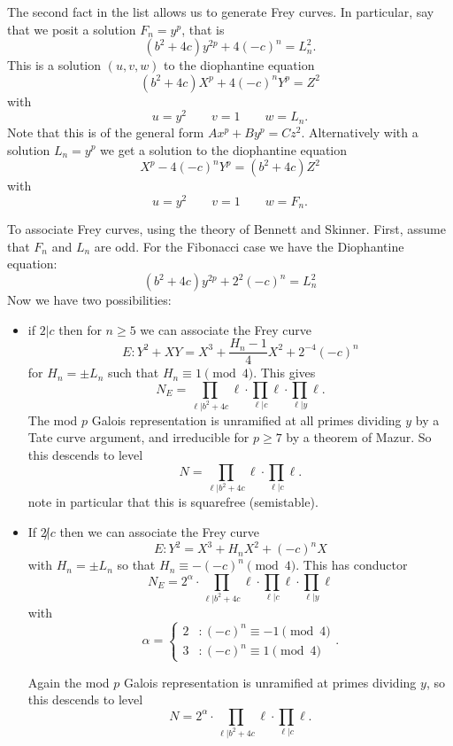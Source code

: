\documentclass[12pt]{article}
\begin{document}
The second fact in the list allows us to generate Frey curves.  In particular, say that we posit a solution $F_n = y^p$, that is
\[ (b^2+4c)y^{2p}+4(-c)^n = L_n^2 .\]
This is a solution $(u,v,w)$ to the diophantine equation
\[ (b^2+4c)X^p +4(-c)^nY^p = Z^2 \]
with 
\[ u = y^2 \qquad v = 1 \qquad w = L_n .\]
Note that this is of the general form $Ax^p+By^p = Cz^2$.  Alternatively with a solution $L_n = y^p$ we get a solution to the diophantine equation
\[ X^p-4(-c)^nY^p = (b^2+4c)Z^2 \]
with
\[ u = y^2 \qquad v = 1 \qquad w = F_n .\]

To associate Frey curves, using the theory of Bennett and Skinner.  First, assume that $F_n$ and $L_n$ are odd.  For the Fibonacci case we have the Diophantine equation:
\[(b^2+4c)y^{2p} +2^2(-c)^n = L_n^2 \]
Now we have two possibilities:

\begin{itemize}

\item if $2 |c$ then for $n \geq 5$ we can associate the Frey curve
\[ E: Y^2 +XY = X^3 +\frac{H_n -1}{4} X^2 +2^{-4}(-c)^n \]
for $H_n = \pm L_n$ such that $H_n \equiv 1 \pmod{4}$.  This gives
\[ N_E = \prod_{\ell | b^2+4c} \ell \cdot \prod_{\ell | c} \ell \cdot \prod_{\ell | y} \ell. \]
The mod $p$ Galois representation is unramified at all primes dividing $y$ by a Tate curve argument, and irreducible for $p \geq 7$ by a theorem of Mazur.  So this descends to level 
\[N = \prod_{\ell | b^2+4c} \ell \cdot \prod_{\ell | c} \ell . \]
note in particular that this is squarefree (semistable).

\item If $2 \not | c$ then we can associate the Frey curve
\[ E: Y^2 = X^3 + H_n X^2 +(-c)^n X\]
with $H_n = \pm L_n$ so that $H_n \equiv -(-c)^n \pmod{4}$.  This has conductor
\[N_E = 2^{\alpha} \cdot  \prod_{\ell | b^2+4c} \ell \cdot \prod_{\ell | c} \ell \cdot \prod_{\ell | y} \ell\] 
with
\[ \alpha = \begin{cases} 2 & : (-c)^n \equiv -1 \pmod{4} \\ 3 & : (-c)^n \equiv 1 \pmod{4} \end{cases}. \]

Again the mod $p$ Galois representation is unramified at primes dividing $y$, so this descends to level
\[ N = 2^\alpha \cdot \prod_{\ell | b^2+4c} \ell \cdot \prod_{\ell | c} \ell . \]

\end{itemize}
\end{document}
